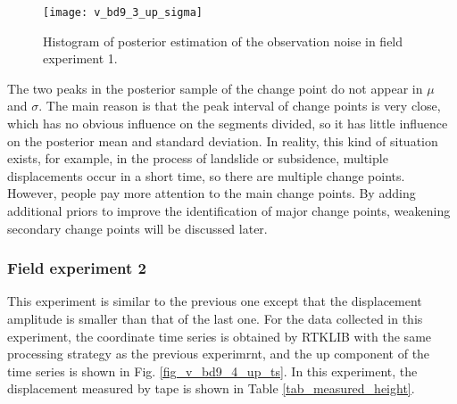 \documentclass{svjour3}                     %
\begin{document}
\begin{figure}[htbp]
	\centering
	\texttt{[image: v\_bd9\_3\_up\_sigma]}
	\caption{Histogram of posterior estimation of the observation noise in field experiment 1.}
	\label{fig_v_bd9_3_up_sigma}
\end{figure} 
The two peaks in the posterior sample of the change point do not appear in $\mu$ and $\sigma$. 
The main reason is that the peak interval of change points is very close, which has no obvious influence on the segments divided, so it has little influence on the posterior mean and standard deviation.
In reality, this kind of situation exists, for example, in the process of landslide or subsidence, multiple displacements occur in a short time, so there are multiple change points. 
However, people pay more attention to the main change points.
By adding additional priors to improve the identification of major change points, weakening secondary change points will be discussed later.


\subsubsection{Field experiment 2}
This experiment is similar to the previous one except that the displacement amplitude is smaller than that of the last one. For the data collected in this experiment,  the coordinate time series is obtained by RTKLIB with the same processing strategy as the previous experimrnt, and the up component of the time series is shown in Fig. \ref{fig_v_bd9_4_up_ts}. In this experiment, the displacement measured by tape is shown in Table \ref{tab_measured_height}.
\end{document}
